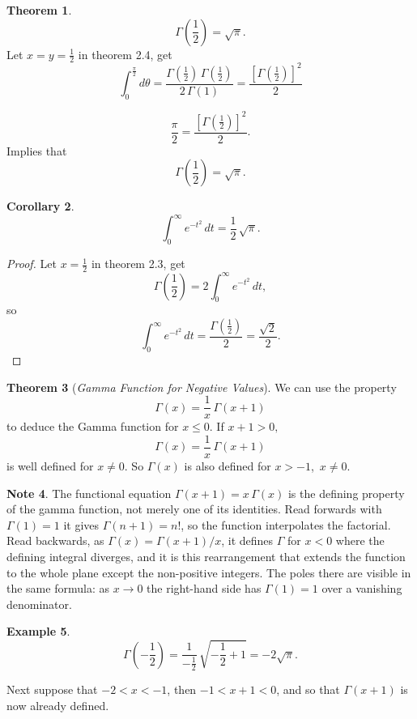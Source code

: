 \documentclass[12pt,a4paper]{report}
\theoremstyle{definition}
\newtheorem{thm}{Theorem}[section]
\newtheorem{exa}[thm]{Example}
\newtheorem{note}[thm]{Note}
\theoremstyle{plain}
\newtheorem{coro}[thm]{Corollary}
\begin{document}
\begin{thm}
$$\Gamma\left(\frac{1}{2}\right) = \sqrt{\pi}.$$
Let $x =y = \frac{1}{2}$ in theorem 2.4, get 
$$\int_0^{\frac{\pi}{2}}d\theta = \frac{\Gamma\left(\frac{1}{2}\right)\, \Gamma\left(\frac{1}{2}\right)}{2\, \Gamma(1)} = \frac{\left[\Gamma\left(\frac{1}{2}\right)\right]^2}{2}$$

$$\frac{\pi}{2}  = \frac{\left[\Gamma\left(\frac{1}{2}\right)\right]^2}{2}.$$
Implies that $$\Gamma\left(\frac{1}{2}\right) = \sqrt{\pi}.$$
\end{thm}





\begin{coro}
$$\int_0^{\infty} e^{-t^2}\, dt = \frac{1}{2}\, \sqrt{\pi}.$$
\end{coro}

\begin{proof}
Let $x = \frac{1}{2}$ in theorem 2.3, get
$$\Gamma\left(\frac{1}{2}\right) = 2\int_0^{\infty}e^{-t^2}\, dt,$$
so
$$\int_0^{\infty} e^{-t^2}\, dt = \frac{\Gamma\left(\frac{1}{2}\right)}{2} = \frac{\sqrt{2}}{2}.$$
\end{proof}



\begin{thm}[\textit{Gamma Function for Negative Values}]
We can use the property $$\Gamma(x) = \frac{1}{x}\, \Gamma(x + 1)$$ to deduce the Gamma function for $x\leq 0$. If  $x + 1 > 0,$ $$\Gamma(x) = \frac{1}{x}\, \Gamma(x + 1)$$ is well defined for $x\neq 0$.
So $\Gamma(x)$ is also defined for $x > -1$, $\, x\neq 0.$
\end{thm}

\begin{note}
The functional equation $\Gamma(x+1)=x\,\Gamma(x)$ is the defining property of
the gamma function, not merely one of its identities. Read forwards with
$\Gamma(1)=1$ it gives $\Gamma(n+1)=n!$, so the function interpolates the
factorial. Read backwards, as $\Gamma(x)=\Gamma(x+1)/x$, it defines $\Gamma$ for
$x<0$ where the defining integral diverges, and it is this rearrangement that
extends the function to the whole plane except the non-positive integers. The
poles there are visible in the same formula: as $x\to 0$ the right-hand side has
$\Gamma(1)=1$ over a vanishing denominator.
\end{note}




\begin{exa}
$$\Gamma\left(-\frac{1}{2}\right) = \frac{1}{-\frac{1}{2}}\, \sqrt{-\frac{1}{2} + 1} = -2\sqrt{\pi}.$$
\end{exa}
Next suppose that $-2 < x < -1$, then $-1 < x + 1 < 0$, and so that $\Gamma(x + 1)$ is now already defined.
\end{document}
